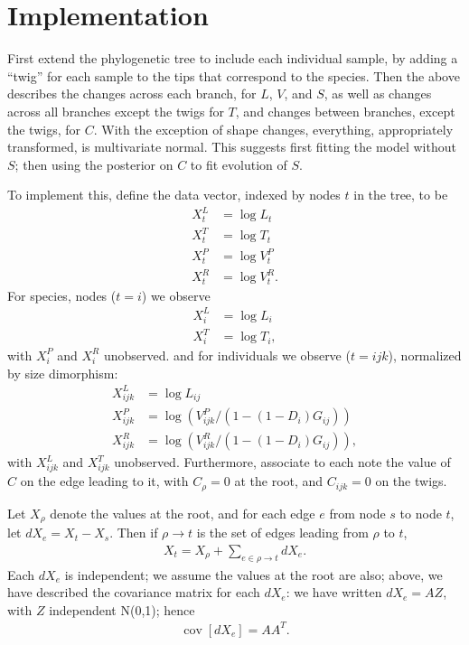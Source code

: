 \documentclass{article}
\DeclareMathOperator{\cov}{cov}
\begin{document}
\section{Implementation}

First extend the phylogenetic tree to include each individual sample, by adding a ``twig'' for each sample
to the tips that correspond to the species.
Then the above describes the changes across each branch, 
for $L$, $V$, and $S$,
as well as changes across all branches except the twigs for $T$,
and changes between branches, except the twigs, for $C$.
With the exception of shape changes, everything, appropriately transformed, 
is multivariate normal.
This suggests first fitting the model without $S$;
then using the posterior on $C$ to fit evolution of $S$.

To implement this, define the data vector, indexed by nodes $t$ in the tree, to be
\begin{align}
    X^L_t &= \log L_t \\
    X^T_t &= \log T_t \\
    X^P_t &= \log V^P_t \\
    X^R_t &= \log V^R_t .
\end{align}
For species, nodes ($t=i$) we observe
\begin{align}
    X^L_i &= \log L_i \\
    X^T_i &= \log T_i ,
\end{align}
with $X^P_i$ and $X^R_i$ unobserved.
and for individuals we observe ($t={ijk}$), normalized by size dimorphism:
\begin{align}
    X^L_{ijk} &= \log L_{ij} \\
    X^P_{ijk} &= \log ( V^P_{ijk} / (1-(1-D_i)G_{ij}) ) \\
    X^R_{ijk} &= \log ( V^R_{ijk} / (1-(1-D_i)G_{ij}) ) ,
\end{align}
with $X^L_{ijk}$ and $X^T_{ijk}$ unobserved.
Furthermore, associate to each note the value of $C$ on the edge leading to it,
with $C_\rho=0$ at the root, and $C_{ijk}=0$ on the twigs.

Let $X_\rho$ denote the values at the root, 
and for each edge $e$ from node $s$ to node $t$, let $dX_e = X_t - X_s$.
Then if $\rho \to t$ is the set of edges leading from $\rho$ to $t$, 
\begin{align}
    X_t = X_\rho + \sum_{e \in \rho \to t} dX_e .
\end{align}
Each $dX_e$ is independent; we assume the values at the root are also;
above, we have described the covariance matrix for each $dX_e$:
we have written $dX_e = A Z$, with $Z$ independent N(0,1);
hence 
\begin{align}
    \cov[dX_e] = A A^T .
\end{align}
\end{document}
